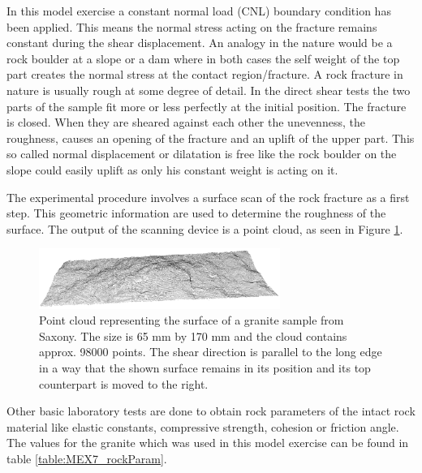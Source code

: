 In this model exercise a constant normal load (CNL) boundary condition has been applied. This means the normal stress acting on the fracture remains constant during the shear displacement. An analogy in the nature would be a rock boulder at a slope or a dam where in both cases the self weight of the top part creates the normal stress at the contact region/fracture.
%
A rock fracture in nature is usually rough at some degree of detail. In the direct shear tests the two parts of the sample fit more or less perfectly at the initial position. The fracture is closed. When they are sheared against each other the unevenness, the roughness, causes an opening of the fracture and an uplift of the upper part. This so called normal displacement or dilatation is free like the rock boulder on the slope could easily uplift as only his constant weight is acting on it.

The experimental procedure involves a surface scan of the rock fracture as a first step. This geometric information are used to determine the roughness of the surface. The output of the scanning device is a point cloud, as seen in Figure \ref{fig:MEX7_pointCloud}.

\begin{figure}[!ht]
\begin{center}
\includegraphics[width=0.7\textwidth]{./figures/MEX7_Point_cloud.png}
\end{center}
\caption{Point cloud representing the surface of a granite sample from Saxony. The size is 65 mm by 170 mm and the cloud contains approx. 98000 points. The shear direction is parallel to the long edge in a way that the shown surface remains in its position and its top counterpart is moved to the right.}
\label{fig:MEX7_pointCloud}
\end{figure}

Other basic laboratory tests are done to obtain rock parameters of the intact rock material like elastic constants, compressive strength, cohesion or friction angle. The values for the granite which was used in this model exercise can be found in table \ref{table:MEX7_rockParam}.


